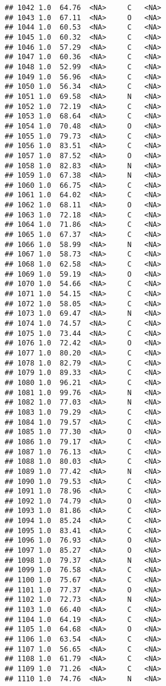 \documentclass[
]{article}
\begin{document}
\begin{verbatim}
## 1042 1.0  64.76  <NA>     C   <NA>
## 1043 1.0  67.11  <NA>     O   <NA>
## 1044 1.0  60.53  <NA>     C   <NA>
## 1045 1.0  60.32  <NA>     C   <NA>
## 1046 1.0  57.29  <NA>     C   <NA>
## 1047 1.0  60.36  <NA>     C   <NA>
## 1048 1.0  52.99  <NA>     C   <NA>
## 1049 1.0  56.96  <NA>     C   <NA>
## 1050 1.0  56.34  <NA>     C   <NA>
## 1051 1.0  69.58  <NA>     N   <NA>
## 1052 1.0  72.19  <NA>     C   <NA>
## 1053 1.0  68.64  <NA>     C   <NA>
## 1054 1.0  70.48  <NA>     O   <NA>
## 1055 1.0  79.73  <NA>     C   <NA>
## 1056 1.0  83.51  <NA>     C   <NA>
## 1057 1.0  87.52  <NA>     O   <NA>
## 1058 1.0  82.83  <NA>     N   <NA>
## 1059 1.0  67.38  <NA>     N   <NA>
## 1060 1.0  66.75  <NA>     C   <NA>
## 1061 1.0  64.02  <NA>     C   <NA>
## 1062 1.0  68.11  <NA>     O   <NA>
## 1063 1.0  72.18  <NA>     C   <NA>
## 1064 1.0  71.86  <NA>     C   <NA>
## 1065 1.0  67.37  <NA>     C   <NA>
## 1066 1.0  58.99  <NA>     N   <NA>
## 1067 1.0  58.73  <NA>     C   <NA>
## 1068 1.0  62.58  <NA>     C   <NA>
## 1069 1.0  59.19  <NA>     O   <NA>
## 1070 1.0  54.66  <NA>     C   <NA>
## 1071 1.0  54.15  <NA>     C   <NA>
## 1072 1.0  58.05  <NA>     C   <NA>
## 1073 1.0  69.47  <NA>     N   <NA>
## 1074 1.0  74.57  <NA>     C   <NA>
## 1075 1.0  73.44  <NA>     C   <NA>
## 1076 1.0  72.42  <NA>     O   <NA>
## 1077 1.0  80.20  <NA>     C   <NA>
## 1078 1.0  82.79  <NA>     C   <NA>
## 1079 1.0  89.33  <NA>     C   <NA>
## 1080 1.0  96.21  <NA>     C   <NA>
## 1081 1.0  99.76  <NA>     N   <NA>
## 1082 1.0  77.03  <NA>     N   <NA>
## 1083 1.0  79.29  <NA>     C   <NA>
## 1084 1.0  79.57  <NA>     C   <NA>
## 1085 1.0  77.30  <NA>     O   <NA>
## 1086 1.0  79.17  <NA>     C   <NA>
## 1087 1.0  76.13  <NA>     C   <NA>
## 1088 1.0  80.03  <NA>     C   <NA>
## 1089 1.0  77.42  <NA>     N   <NA>
## 1090 1.0  79.53  <NA>     C   <NA>
## 1091 1.0  78.96  <NA>     C   <NA>
## 1092 1.0  74.79  <NA>     O   <NA>
## 1093 1.0  81.86  <NA>     C   <NA>
## 1094 1.0  85.24  <NA>     C   <NA>
## 1095 1.0  83.41  <NA>     C   <NA>
## 1096 1.0  76.93  <NA>     O   <NA>
## 1097 1.0  85.27  <NA>     O   <NA>
## 1098 1.0  79.37  <NA>     N   <NA>
## 1099 1.0  76.58  <NA>     C   <NA>
## 1100 1.0  75.67  <NA>     C   <NA>
## 1101 1.0  77.37  <NA>     O   <NA>
## 1102 1.0  72.73  <NA>     N   <NA>
## 1103 1.0  66.40  <NA>     C   <NA>
## 1104 1.0  64.19  <NA>     C   <NA>
## 1105 1.0  64.68  <NA>     O   <NA>
## 1106 1.0  63.54  <NA>     C   <NA>
## 1107 1.0  56.65  <NA>     C   <NA>
## 1108 1.0  61.79  <NA>     C   <NA>
## 1109 1.0  71.26  <NA>     C   <NA>
## 1110 1.0  74.76  <NA>     N   <NA>

\end{verbatim}
\end{document}
